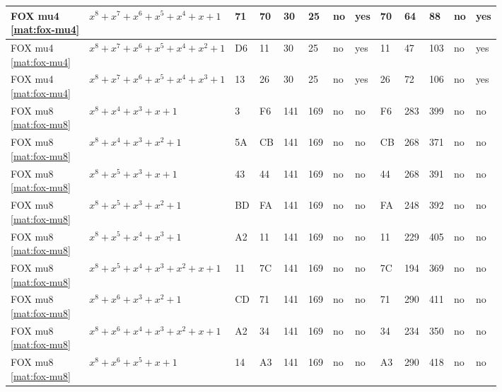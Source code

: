 \begin{tiny}
\begin{longtable}{|l|l|l|l|l|l|l|l|l|l|l|l|l|}
\shortstack{FOX mu4 \\ \eqref{mat:fox-mu4}} & $x^8 + x^7 + x^6 + x^5 + x^4 + x + 1$ & 71 & 70 & 30 & 25 & no & yes & 70 & 64 & 88 & no & yes \\ \hline
\shortstack{FOX mu4 \\ \eqref{mat:fox-mu4}} & $x^8 + x^7 + x^6 + x^5 + x^4 + x^2 + 1$ & D6 & 11 & 30 & 25 & no & yes & 11 & 47 & 103 & no & yes \\ \hline
\shortstack{FOX mu4 \\ \eqref{mat:fox-mu4}} & $x^8 + x^7 + x^6 + x^5 + x^4 + x^3 + 1$ & 13 & 26 & 30 & 25 & no & yes & 26 & 72 & 106 & no & yes \\ \hline
\shortstack{FOX mu8 \\ \eqref{mat:fox-mu8}} & $x^8 + x^4 + x^3 + x + 1$ & 3 & F6 & 141 & 169 & no & no & F6 & 283 & 399 & no & no \\ \hline
\shortstack{FOX mu8 \\ \eqref{mat:fox-mu8}} & $x^8 + x^4 + x^3 + x^2 + 1$ & 5A & CB & 141 & 169 & no & no & CB & 268 & 371 & no & no \\ \hline
\shortstack{FOX mu8 \\ \eqref{mat:fox-mu8}} & $x^8 + x^5 + x^3 + x + 1$ & 43 & 44 & 141 & 169 & no & no & 44 & 268 & 391 & no & no \\ \hline
\shortstack{FOX mu8 \\ \eqref{mat:fox-mu8}} & $x^8 + x^5 + x^3 + x^2 + 1$ & BD & FA & 141 & 169 & no & no & FA & 248 & 392 & no & no \\ \hline
\shortstack{FOX mu8 \\ \eqref{mat:fox-mu8}} & $x^8 + x^5 + x^4 + x^3 + 1$ & A2 & 11 & 141 & 169 & no & no & 11 & 229 & 405 & no & no \\ \hline
\shortstack{FOX mu8 \\ \eqref{mat:fox-mu8}} & $x^8 + x^5 + x^4 + x^3 + x^2 + x + 1$ & 11 & 7C & 141 & 169 & no & no & 7C & 194 & 369 & no & no \\ \hline
\shortstack{FOX mu8 \\ \eqref{mat:fox-mu8}} & $x^8 + x^6 + x^3 + x^2 + 1$ & CD & 71 & 141 & 169 & no & no & 71 & 290 & 411 & no & no \\ \hline
\shortstack{FOX mu8 \\ \eqref{mat:fox-mu8}} & $x^8 + x^6 + x^4 + x^3 + x^2 + x + 1$ & A2 & 34 & 141 & 169 & no & no & 34 & 234 & 350 & no & no \\ \hline
\shortstack{FOX mu8 \\ \eqref{mat:fox-mu8}} & $x^8 + x^6 + x^5 + x + 1$ & 14 & A3 & 141 & 169 & no & no & A3 & 290 & 418 & no & no \\ \hline

\end{longtable}
\end{tiny}
